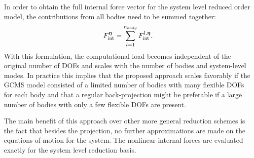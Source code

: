 In order to obtain the full internal force vector for the system level reduced order model, the contributions from all bodies need to be summed together:
\begin{equation}
F_{\mathrm{int}}^{\bm \eta} = \sum_{l=1}^{n_{body}}F_{\mathrm{int}}^{l,\bm \eta}. 
\end{equation}
With this formulation, the computational load becomes independent of the original number of DOFs and scales with the number of bodies and system-level modes. In practice this implies that the proposed approach scales favorably if the GCMS model consisted of a limited number of bodies with many flexible DOFs for each body and that a regular back-projection might be preferable if a large number of bodies with only a few flexible DOFs are present. 
 
The main benefit of this approach over other more general reduction schemes is the fact that besides the projection, no further approximations are made on the equations of motion for the system. The nonlinear internal forces are evaluated exactly for the system level reduction basis. 


